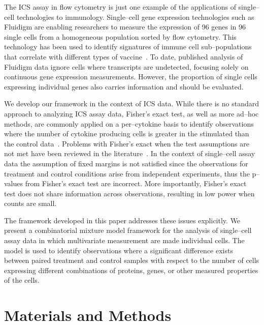 \documentclass[11pt]{article}
\begin{document}
The ICS assay in flow cytometry is just one example of the applications of single--cell technologies to immunology. Single--cell gene expression technologies such as Fluidigm are enabling researchers to measure the expression of 96 genes in 96 single cells from a homogeneous population sorted by flow cytometry\cite{Jang:2011uj}. This technology has been used to identify signatures of immune cell sub--populations that correlate with different types of vaccine~\cite{Flatz:2011jb}. To date, published analysis of Fluidigm data ignore cells where transcripts are undetected, focusing solely on continuous gene expression measurements. However, the proportion of single cells expressing individual genes also carries information and should be evaluated.

We develop our framework in the context of ICS data. While there is no standard approach to analyzing ICS assay data, Fisher's exact test, as well as more ad--hoc methods, are commonly applied on a per--cytokine basis to identify observations where the number of cytokine producing cells is greater in the stimulated than the control data~\cite{Trigona:2003,Sinclair:2004hs,Horton:2007tsa}. Problems with Fisher's exact when the test assumptions are not met have been reviewed in the literature~\cite{Proschan:2009ks}. In the context of single--cell assay data the assumption of fixed margins is not satisfied since the observations for treatment and control conditions arise from independent experiments, thus the p--values from Fisher's exact test are incorrect. More importantly, Fisher's exact test does not share information across observations, resulting in low power when counts are small. 

The framework developed in this paper addresses these issues explicitly. We present a combinatorial mixture model framework for the analysis of single--cell assay data in which multivariate measurement are made individual cells. The model is used to identify observations where a significant difference exists between paired treatment and control samples with respect to the number of cells expressing  different combinations of proteins, genes, or other measured properties of the cells. 

\section*{Materials and Methods}
\end{document}
